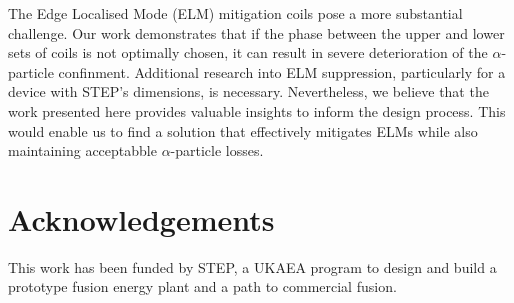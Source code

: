 \documentclass[10pt, a4paper, twoside]{article}
\begin{document}
The Edge Localised Mode (ELM) mitigation coils pose a more substantial challenge. Our work demonstrates that if the phase between the upper and lower sets of coils is not optimally chosen, it can result in severe deterioration of the $\alpha$-particle confinment. Additional research into ELM suppression, particularly for a device with STEP's dimensions, is necessary. Nevertheless, we believe that the work presented here provides valuable insights to inform the design process. This would enable us to find a solution that effectively mitigates ELMs while also maintaining acceptabble $\alpha$-particle losses.

\section*{Acknowledgements}

This work has been funded by STEP, a UKAEA program to design and build a prototype fusion energy plant and a path to commercial fusion.
\end{document}
